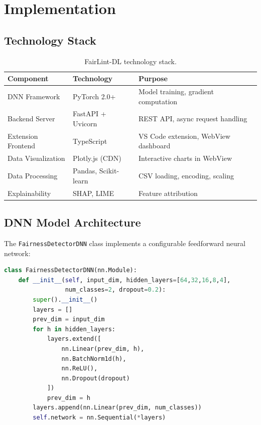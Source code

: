 \chapter{Implementation}
\label{ch:implementation}

\section{Technology Stack}

\begin{table}[H]
\centering
\caption{FairLint-DL technology stack.}
\label{tab:techstack}
\begin{tabular}{@{}lll@{}}
\toprule
\textbf{Component} & \textbf{Technology} & \textbf{Purpose} \\
\midrule
DNN Framework & PyTorch 2.0+ & Model training, gradient computation \\
Backend Server & FastAPI + Uvicorn & REST API, async request handling \\
Extension Frontend & TypeScript & VS Code extension, WebView dashboard \\
Data Visualization & Plotly.js (CDN) & Interactive charts in WebView \\
Data Processing & Pandas, Scikit-learn & CSV loading, encoding, scaling \\
Explainability & SHAP, LIME & Feature attribution \\
\bottomrule
\end{tabular}
\end{table}

\section{DNN Model Architecture}

The \texttt{FairnessDetectorDNN} class implements a configurable feedforward neural network:

\begin{lstlisting}[language=Python, caption={DNN architecture definition (simplified).}]
class FairnessDetectorDNN(nn.Module):
    def __init__(self, input_dim, hidden_layers=[64,32,16,8,4],
                 num_classes=2, dropout=0.2):
        super().__init__()
        layers = []
        prev_dim = input_dim
        for h in hidden_layers:
            layers.extend([
                nn.Linear(prev_dim, h),
                nn.BatchNorm1d(h),
                nn.ReLU(),
                nn.Dropout(dropout)
            ])
            prev_dim = h
        layers.append(nn.Linear(prev_dim, num_classes))
        self.network = nn.Sequential(*layers)
\end{lstlisting}

